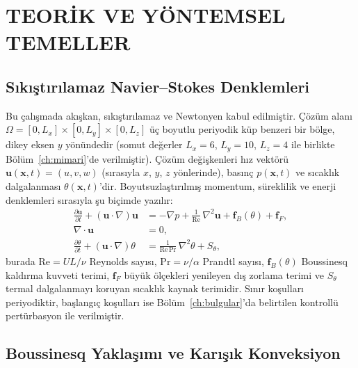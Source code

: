 \chapter{TEORİK VE YÖNTEMSEL TEMELLER}
\label{ch:teorik}

\section{Sıkıştırılamaz Navier--Stokes Denklemleri}

Bu çalışmada akışkan, sıkıştırılamaz ve Newtonyen kabul edilmiştir. Çözüm alanı $\Omega = [0,L_{x}]\times[0,L_{y}]\times[0,L_{z}]$ üç boyutlu periyodik küp benzeri bir bölge, dikey eksen $y$ yönündedir (somut değerler $L_{x}=6$, $L_{y}=10$, $L_{z}=4$ ile birlikte Bölüm~\ref{ch:mimari}'de verilmiştir). Çözüm değişkenleri hız vektörü $\mathbf{u}(\mathbf{x},t)=(u,v,w)$ (sırasıyla $x$, $y$, $z$ yönlerinde), basınç $p(\mathbf{x},t)$ ve sıcaklık dalgalanması $\theta(\mathbf{x},t)$'dir. Boyutsuzlaştırılmış momentum, süreklilik ve enerji denklemleri sırasıyla şu biçimde yazılır:
\begin{align}
\frac{\partial \mathbf{u}}{\partial t} + (\mathbf{u}\cdot\nabla)\mathbf{u}
&= -\nabla p + \frac{1}{\mathrm{Re}}\,\nabla^{2}\mathbf{u} + \mathbf{f}_{B}(\theta) + \mathbf{f}_{F}, \label{eq:ns_mom} \\
\nabla \cdot \mathbf{u} &= 0, \label{eq:ns_cont} \\
\frac{\partial \theta}{\partial t} + (\mathbf{u}\cdot\nabla)\theta
&= \frac{1}{\mathrm{Re}\,\mathrm{Pr}}\,\nabla^{2}\theta + S_{\theta}, \label{eq:ns_energy}
\end{align}
burada $\mathrm{Re}=UL/\nu$ Reynolds sayısı, $\mathrm{Pr}=\nu/\alpha$ Prandtl sayısı, $\mathbf{f}_{B}(\theta)$ Boussinesq kaldırma kuvveti terimi, $\mathbf{f}_{F}$ büyük ölçekleri yenileyen dış zorlama terimi ve $S_{\theta}$ termal dalgalanmayı koruyan sıcaklık kaynak terimidir. Sınır koşulları periyodiktir, başlangıç koşulları ise Bölüm~\ref{ch:bulgular}'da belirtilen kontrollü pertürbasyon ile verilmiştir.

\section{Boussinesq Yaklaşımı ve Karışık Konveksiyon}

